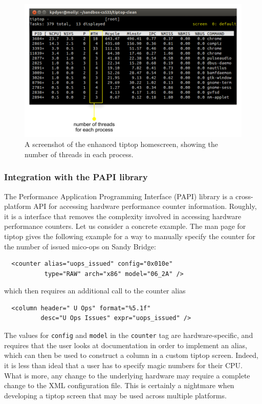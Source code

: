 \begin{figure}[t]
\footnotesize
\centering
\includegraphics[width=.7\textwidth]{tiptop-threads}
\caption{A screenshot of the enhanced tiptop homescreen, showing the number of threads in each process.}
\label{fig:tiptop-threads}
\end{figure}

\subsubsection{Integration with the PAPI library}
The Performance Application Programming Interface (PAPI) library is a cross-platform API for accessing hardware performance counter information.
Roughly, it is a interface that removes the complexity involved in accessing hardware performance counters.
Let us consider a concrete example.
The man page for tiptop gives the following example for a way to manually specify the counter for the number of issued mico-ops on Sandy Bridge:
\begin{verbatim}
  <counter alias="uops_issued" config="0x010e"
           type="RAW" arch="x86" model="06_2A" />
\end{verbatim}
which then requires an additional call to the counter alias
\begin{verbatim}
  <column header=" U Ops" format="%5.1f"
          desc="U Ops Issues" expr="uops_issued" />
\end{verbatim}

The values for \texttt{config} and \texttt{model} in the \texttt{counter} tag are hardware-specific, and requires that the user looks at documentation in order to implement an alias, which can then be used to construct a column in a custom tiptop screen.
Indeed, it is less than ideal that a user has to specify magic numbers for their CPU.
What is more, any change to the underlying hardware may require a complete change to the XML configuration file.
This is certainly a nightmare when developing a tiptop screen that may be used across multiple platforms.

